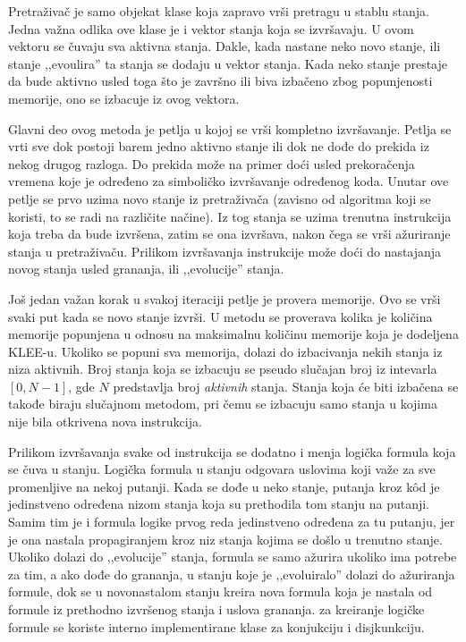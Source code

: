 \documentclass[12pt,oneside]{memoir}
\begin{document}
Pretraživač je samo objekat klase koja zapravo vrši pretragu u stablu stanja. Jedna važna odlika ove klase je i vektor stanja koja se izvršavaju. U ovom vektoru se čuvaju sva aktivna stanja. Dakle, kada nastane neko novo stanje, ili stanje ,,evoulira'' ta stanja se dodaju u vektor stanja. Kada neko stanje prestaje da bude aktivno usled toga što je završno ili biva izbačeno zbog popunjenosti memorije, ono se izbacuje iz ovog vektora. 

Glavni deo ovog metoda je petlja u kojoj se vrši kompletno izvršavanje. Petlja se vrti sve dok postoji barem jedno aktivno stanje ili dok ne dođe do prekida iz nekog drugog razloga. Do prekida može na primer doći usled prekoračenja vremena koje je određeno za simboličko izvršavanje određenog koda. Unutar ove petlje se prvo uzima novo stanje iz pretraživača (zavisno od algoritma koji se koristi, to se radi na različite načine). Iz tog stanja se uzima trenutna instrukcija koja treba da bude izvršena, zatim se ona izvršava, nakon čega se vrši ažuriranje stanja u pretraživaču. Prilikom izvršavanja instrukcije može doći do nastajanja novog stanja usled grananja, ili ,,evolucije'' stanja. 

Još jedan važan korak u svakoj iteraciji petlje je provera memorije. Ovo se vrši svaki put kada se novo stanje izvrši. U metodu se proverava kolika je količina memorije popunjena u odnosu na maksimalnu količinu memorije koja je dodeljena KLEE-u. Ukoliko se popuni sva memorija, dolazi do izbacivanja nekih stanja iz niza aktivnih. Broj stanja koja se izbacuju se pseudo slučajan broj iz intevarla $[0, N - 1]$, gde $N$ predstavlja broj \textit{aktivnih} stanja. Stanja koja će biti izbačena se takođe biraju slučajnom metodom, pri čemu se izbacuju samo stanja u kojima nije bila otkrivena nova instrukcija.

Prilikom izvršavanja svake od instrukcija se dodatno i menja logička formula koja se čuva u stanju. Logička formula u stanju odgovara uslovima koji važe za sve promenljive na nekoj putanji. Kada se dođe u neko stanje, putanja kroz k\^od je jedinstveno određena nizom stanja koja su prethodila tom stanju na putanji. Samim tim je i formula logike prvog reda jedinstveno određena za tu putanju, jer je ona nastala propagiranjem kroz niz stanja kojima se došlo u trenutno stanje. Ukoliko dolazi do ,,evolucije'' stanja, formula se samo ažurira ukoliko ima potrebe za tim, a ako dođe do grananja, u stanju koje je ,,evoluiralo'' dolazi do ažuriranja formule, dok se u novonastalom stanju kreira nova formula koja je nastala od formule iz prethodno izvršenog stanja i uslova grananja. za kreiranje logičke formule se koriste interno implementirane klase za konjukciju i disjkunkciju.   
\end{document}
